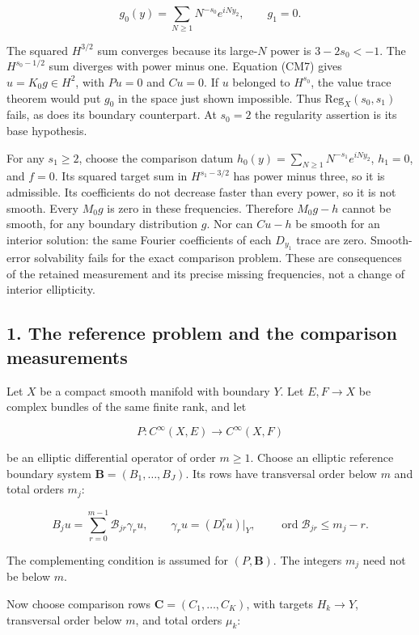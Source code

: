 \documentclass[
  11pt,
]{article}
\begin{document}
\[
 g_0(y)=\sum_{N\geq1}N^{-s_0}e^{iNy_2},\qquad g_1=0.
 \tag{CM14}
\]

The squared \(H^{3/2}\) sum converges because its large-\(N\) power is
\(3-2s_0<-1\). The \(H^{s_0-1/2}\) sum diverges with power minus one.
Equation (CM7) gives \(u=K_0g\in H^2\), with \(Pu=0\) and \(Cu=0\). If
\(u\) belonged to \(H^{s_0}\), the value trace theorem would put \(g_0\)
in the space just shown impossible. Thus \(\mathrm{Reg}_X(s_0,s_1)\)
fails, as does its boundary counterpart. At \(s_0=2\) the regularity
assertion is its base hypothesis.

For any \(s_1\geq2\), choose the comparison datum
\(h_0(y)=\sum_{N\geq1}N^{-s_1}e^{iNy_2}\), \(h_1=0\), and \(f=0\). Its
squared target sum in \(H^{s_1-3/2}\) has power minus three, so it is
admissible. Its coefficients do not decrease faster than every power, so
it is not smooth. Every \(M_0g\) is zero in these frequencies. Therefore
\(M_0g-h\) cannot be smooth, for any boundary distribution \(g\). Nor
can \(Cu-h\) be smooth for an interior solution: the same Fourier
coefficients of each \(D_{y_1}\) trace are zero. Smooth-error
solvability fails for the exact comparison problem. These are
consequences of the retained measurement and its precise missing
frequencies, not a change of interior ellipticity.

\subsection{1. The reference problem and the comparison
measurements}\label{the-reference-problem-and-the-comparison-measurements}

Let \(X\) be a compact smooth manifold with boundary \(Y\). Let
\(E,F\to X\) be complex bundles of the same finite rank, and let

\[
 P:C^\infty(X,E)\longrightarrow C^\infty(X,F)
 \tag{BDR1}
\]

be an elliptic differential operator of order \(m\geq1\). Choose an
elliptic reference boundary system \(\mathbf B=(B_1,\ldots,B_J)\). Its
rows have transversal order below \(m\) and total orders \(m_j\):

\[
 B_j u=\sum_{r=0}^{m-1}\mathcal B_{jr}\gamma_r u,
 \qquad \gamma_r u=(D_t^ru)|_Y,
 \qquad \operatorname{ord}\mathcal B_{jr}\leq m_j-r.
 \tag{BDR2}
\]

The complementing condition is assumed for \((P,\mathbf B)\). The
integers \(m_j\) need not be below \(m\).

Now choose comparison rows \(\mathbf C=(C_1,\ldots,C_K)\), with targets
\(H_k\to Y\), transversal order below \(m\), and total orders \(\mu_k\):
\end{document}
